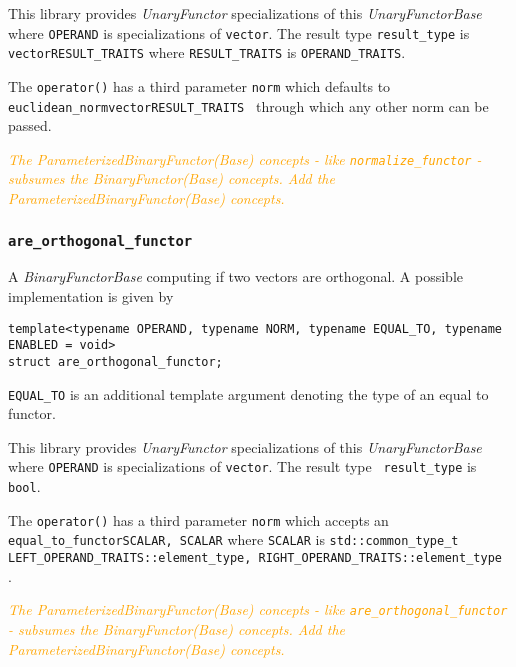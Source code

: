 \documentclass[oneside]{book}
\begin{document}
This library provides \textit{UnaryFunctor} specializations of this \textit{UnaryFunctorBase} where
\texttt{OPERAND} is specializations of \texttt{vector}. The result type \texttt{result\_type}    is
\texttt{vector\textlangle RESULT\_TRAITS\textrangle} where \texttt{RESULT\_TRAITS}               is
\texttt{OPERAND\_TRAITS}.\newline

The \texttt{operator()} has a third parameter  \texttt{norm} which defaults to
\texttt{euclidean\_norm\textlangle vector\textlangle RESULT\_TRAITS\textrangle
\textrangle} through which any other norm can be passed.\newline

\textit{\textcolor{orange}{The \textit{ParameterizedBinaryFunctor(Base)} concepts - like
\texttt{normalize\_functor}       - subsumes the \textit{BinaryFunctor(Base)}  concepts.
Add the \textit{ParameterizedBinaryFunctor(Base) concepts.}}}

\subsubsection{\texttt{are\_orthogonal\_functor}}
A \textit{BinaryFunctorBase} computing if two vectors are orthogonal.
A possible implementation is given by
\begin{verbatim}
template<typename OPERAND, typename NORM, typename EQUAL_TO, typename ENABLED = void>
struct are_orthogonal_functor;
\end{verbatim}
\texttt{EQUAL\_TO} is an additional template argument denoting the type of an equal to functor.\newline

This library provides \textit{UnaryFunctor} specializations of this \textit{UnaryFunctorBase}
where \texttt{OPERAND} is specializations of \texttt{vector}. The result type        \texttt{
result\_type} is \texttt{bool}.\newline

The \texttt{operator()} has a third parameter \texttt{norm}   which accepts an
\texttt{equal\_to\_functor\textlangle SCALAR, SCALAR\textrangle}         where
\texttt{SCALAR} is \texttt{std::common\_type\_t                    \textlangle
LEFT\_OPERAND\_TRAITS::element\_type,    RIGHT\_OPERAND\_TRAITS::element\_type
\textrangle}.\newline

\textit{\textcolor{orange}{The \textit{ParameterizedBinaryFunctor(Base)} concepts - like
\texttt{are\_orthogonal\_functor} - subsumes the \textit{BinaryFunctor(Base)}  concepts.
Add the \textit{ParameterizedBinaryFunctor(Base) concepts.}}}
\end{document}

